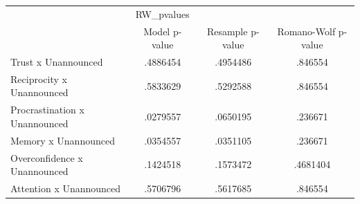 \begin{tabular}{l*{3}{c}}
\hline\hline
            &  RW\_pvalues&            &            \\
            &Model p-value&Resample p-value&Romano-Wolf p-value\\
\hline
Trust x Unannounced&    .4886454&    .4954486&     .846554\\
Reciprocity x Unannounced&    .5833629&    .5292588&     .846554\\
Procrastination x Unannounced&    .0279557&    .0650195&     .236671\\
Memory x Unannounced&    .0354557&    .0351105&     .236671\\
Overconfidence x Unannounced&    .1424518&    .1573472&    .4681404\\
Attention x Unannounced&    .5706796&    .5617685&     .846554\\
\hline\hline
\end{tabular}
